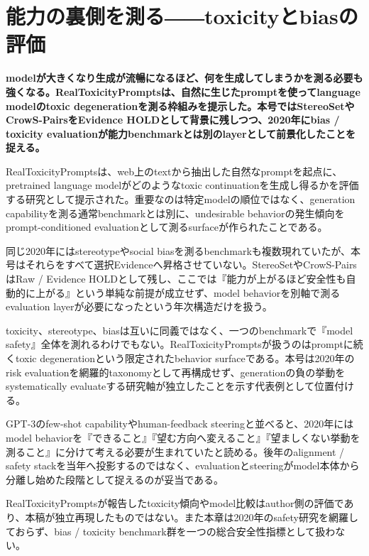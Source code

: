 \section{能力の裏側を測る――toxicityとbiasの評価}
\noindent\textbf{modelが大きくなり生成が流暢になるほど、何を生成してしまうかを測る必要も強くなる。RealToxicityPromptsは、自然に生じたpromptを使ってlanguage modelのtoxic degenerationを測る枠組みを提示した。本号ではStereoSetやCrowS-PairsをEvidence HOLDとして背景に残しつつ、2020年にbias / toxicity evaluationが能力benchmarkとは別のlayerとして前景化したことを捉える。}\autocite{src-308178e74f55}

RealToxicityPromptsは、web上のtextから抽出した自然なpromptを起点に、pretrained language modelがどのようなtoxic continuationを生成し得るかを評価する研究として提示された。重要なのは特定modelの順位ではなく、generation capabilityを測る通常benchmarkとは別に、undesirable behaviorの発生傾向をprompt-conditioned evaluationとして測るsurfaceが作られたことである。\autocite{src-308178e74f55}


同じ2020年にはstereotypeやsocial biasを測るbenchmarkも複数現れていたが、本号はそれらをすべて選択Evidenceへ昇格させていない。StereoSetやCrowS-PairsはRaw / Evidence HOLDとして残し、ここでは『能力が上がるほど安全性も自動的に上がる』という単純な前提が成立せず、model behaviorを別軸で測るevaluation layerが必要になったという年次構造だけを扱う。\autocite{src-308178e74f55}


toxicity、stereotype、biasは互いに同義ではなく、一つのbenchmarkで『model safety』全体を測れるわけでもない。RealToxicityPromptsが扱うのはpromptに続くtoxic degenerationという限定されたbehavior surfaceである。本号は2020年のrisk evaluationを網羅的taxonomyとして再構成せず、generationの負の挙動をsystematically evaluateする研究軸が独立したことを示す代表例として位置付ける。\autocite{src-308178e74f55}


GPT-3のfew-shot capabilityやhuman-feedback steeringと並べると、2020年にはmodel behaviorを『できること』『望む方向へ変えること』『望ましくない挙動を測ること』に分けて考える必要が生まれていたと読める。後年のalignment / safety stackを当年へ投影するのではなく、evaluationとsteeringがmodel本体から分離し始めた段階として捉えるのが妥当である。\autocite{src-308178e74f55}


\begin{claimboundary}
RealToxicityPromptsが報告したtoxicity傾向やmodel比較はauthor側の評価であり、本稿が独立再現したものではない。また本章は2020年のsafety研究を網羅しておらず、bias / toxicity benchmark群を一つの総合安全性指標として扱わない。\autocite{src-308178e74f55}
\end{claimboundary}
